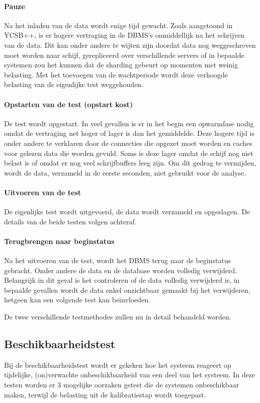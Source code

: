 \paragraph{Pauze} Na het inladen van de data wordt enige tijd gewacht. Zoals aangetoond in YCSB++\cite[Figuur 9]{patil2011ycsb++}, is er hogere vertraging in de DBMS's onmiddellijk na het schrijven van de data. Dit kan onder andere te wijten zijn doordat data nog weggeschreven moet worden naar schijf, gerepliceerd over verschillende servers of in bepaalde systemen zou het kunnen dat de sharding gebeurt op momenten met weinig belasting. Met het toevoegen van de wachtperiode wordt deze verhoogde belasting van de eigenlijke test weggehouden. 

\paragraph{Opstarten van de test (opstart kost)} De test wordt opgestart. In veel gevallen is er in het begin een opwarmfase nodig omdat de vertraging net hoger of lager is dan het gemiddelde. Deze hogere tijd is onder andere te verklaren door de connecties die opgezet moet worden en caches voor gelezen data die worden gevuld. Soms is deze lager omdat de schijf nog niet belast is of omdat er nog veel schrijfbuffers leeg zijn. Om dit gedrag te vermijden, wordt de data, verzameld in de eerste seconden, niet gebruikt voor de analyse. 

\paragraph{Uitvoeren van de test} De eigenlijke test wordt uitgevoerd, de data wordt verzameld en opgeslagen. De details van de beide testen volgen achteraf. 

\paragraph{Terugbrengen naar beginstatus} Na het uitvoeren van de test, wordt het DBMS terug naar de beginstatus gebracht. Onder andere de data en de database worden volledig verwijderd. Belangrijk in dit geval is het controleren of de data volledig verwijderd is, in bepaalde gevallen wordt de data enkel onzichtbaar gemaakt bij het verwijderen, hetgeen kan een volgende test kan beïnvloeden. 

De twee verschillende testmethodes zullen nu in detail behandeld worden. 
\subsection{Beschikbaarheidstest}
Bij de beschikbaarheidstest wordt er gekeken hoe het systeem reageert op tijdelijke, (on)verwachte onbeschikbaarheid van een deel van het systeem. In deze testen worden er 3 mogelijke oorzaken getest die de systemen onbeschikbaar maken, terwijl de belasting uit de kalibratiestap wordt toegepast. 

